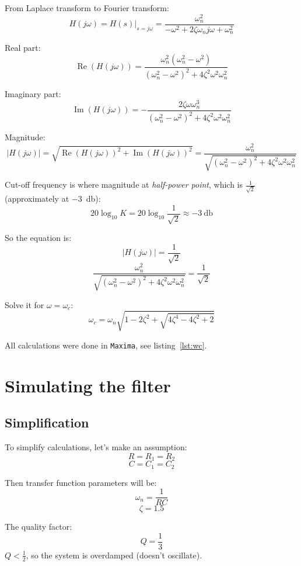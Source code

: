 \documentclass[12pt, a4paper]{article}
\renewcommand{\Re}{\operatorname{Re}}
\renewcommand{\Im}{\operatorname{Im}}
\providecommand{\abs}[1]{\lvert#1\rvert}
\newcommand{\appname}[1]{\texttt{#1}}
\begin{document}
From Laplace transform to Fourier transform:
\[ H(j \omega) = H(s)\bigr\rvert_{s = j \omega}
   = \frac{\omega_n^2}{-\omega^2 + 2 \zeta \omega_n j \omega + \omega_n^2} \]

Real part:
\[ \Re(H(j \omega)) =
   \frac{\omega_n^2 (\omega_n^2 - \omega^2)}
        {(\omega_n^2 - \omega^2)^2 + 4 \zeta^2 \omega^2 \omega_n^2} \]

Imaginary part:
\[ \Im(H(j \omega)) =
   - \frac{2 \zeta \omega \omega_n^3}
          {(\omega_n^2 - \omega^2)^2 + 4 \zeta^2 \omega^2 \omega_n^2} \]

Magnitude:
\[ \abs{H(j \omega)} = \sqrt{\Re(H(j \omega))^2 + \Im(H(j \omega))^2}
   = \frac{\omega_n^2}{\sqrt{(\omega_n^2 - \omega^2)^2
                             + 4 \zeta^2 \omega^2 \omega_n^2}} \]

Cut-off frequency is where magnitude at \textit{half-power point}, which is
$\frac{1}{\sqrt{2}}$ (approximately at \SI{-3}{\decibel}):
\[ 20 \log_{10}{K} = 20 \log_{10}{\frac{1}{\sqrt{2}}} \approx
   \SI{-3}{\decibel} \]

So the equation is:
\[ \abs{H(j \omega)} = \frac{1}{\sqrt{2}} \]
\[ \frac{\omega_n^2}{\sqrt{(\omega_n^2 - \omega^2)^2
                           + 4 \zeta^2 \omega^2 \omega_n^2}}
   = \frac{1}{\sqrt{2}} \]

Solve it for $\omega = \omega_c$:
\[ \omega_c = \omega_n \sqrt{1 - 2 \zeta^2
                             + \sqrt{4 \zeta^4 - 4 \zeta^2 + 2}} \]

All calculations were done in \appname{Maxima}, see listing~\ref{lst:wc}.



\section{Simulating the filter}

\subsection{Simplification}

To simplify calculations, let's make an assumption:
\[ R = R_1 = R_2 \]
\[ C = C_1 = C_2 \]

Then transfer function parameters will be:
\[ \omega_n = \frac{1}{R C} \]
\[ \zeta = 1.5 \]

The quality factor:
\[ Q = \frac{1}{3} \]
$Q < \frac{1}{2}$, so the system is overdamped (doesn't oscillate).
\end{document}
